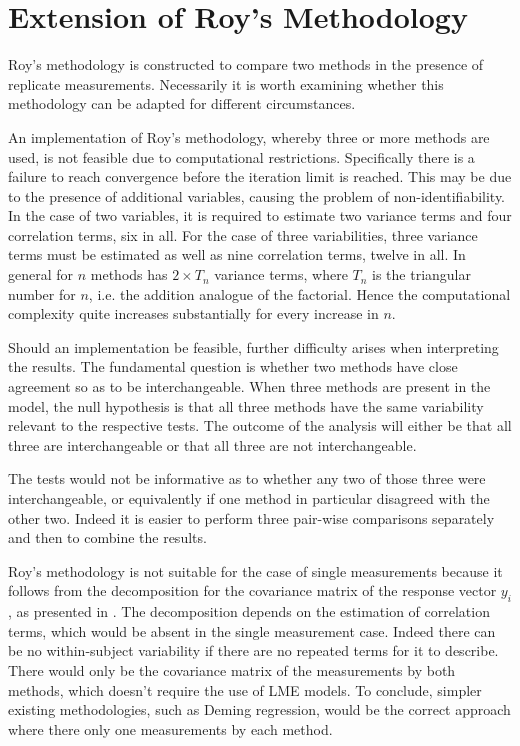 \documentclass[12pt, a4paper]{report}
\theoremstyle{plain}
\theoremstyle{definition}
\theoremstyle{remark}
\begin{document}
\section{Extension of Roy's Methodology}
Roy's methodology is constructed to compare two methods in the presence of replicate measurements. Necessarily it is worth examining whether this methodology can be adapted for different circumstances.

An implementation of Roy's methodology, whereby three or more methods are used, is not feasible due to computational restrictions. Specifically there is a failure to reach convergence before the iteration limit is reached. This may be due to the presence of additional variables, causing the problem of non-identifiability. In the case of two variables, it is required to estimate two variance terms and four correlation terms, six in all. For the case of three variabilities, three variance terms must be estimated as well as nine correlation terms, twelve in all. In general for $n$ methods has $2 \times T_{n}$ variance terms, where $T_n$ is the triangular number for $n$, i.e. the addition analogue of the factorial. Hence the computational complexity quite increases substantially for every increase in $n$.

Should an implementation be feasible, further difficulty arises when interpreting the results. The fundamental question is whether two methods have close agreement so as to be interchangeable. When three methods are present in the model, the null hypothesis is that all three methods have the same variability relevant to the respective tests. The outcome of the analysis will either be that all three are interchangeable or that all three are not interchangeable.

The tests would not be informative as to whether any two of those three were interchangeable, or equivalently if one method in particular disagreed with the other two. Indeed it is easier to perform three pair-wise comparisons separately and then to combine the results.

Roy's methodology is not suitable for the case of single measurements because it follows from the decomposition for the covariance matrix of the response vector $y_{i}$, as presented in \citet{hamlett}. The decomposition depends on the estimation of correlation terms, which would be absent in the single measurement case. Indeed there can be no within-subject variability if there are no repeated terms for it to describe. There would only be the covariance matrix of the measurements by both methods, which doesn't require the use of LME models. To conclude, simpler existing methodologies, such as Deming regression, would be the correct approach where there only one measurements by each method.
\end{document}
